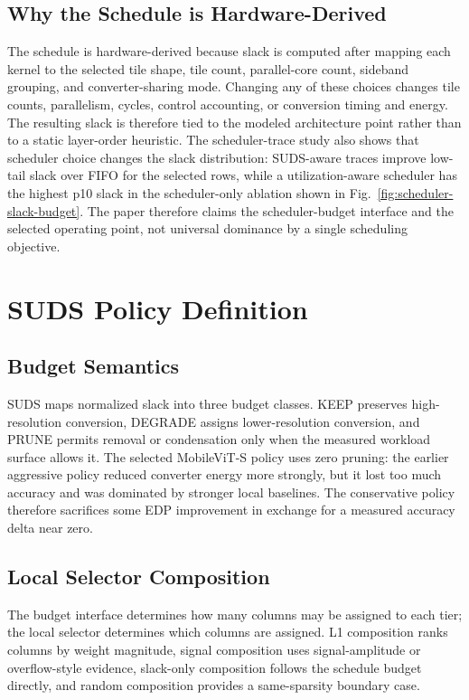 \documentclass[10pt,journal]{IEEEtran}
\begin{document}
\subsection{Why the Schedule is Hardware-Derived}

The schedule is hardware-derived because slack is computed after mapping each
kernel to the selected tile shape, tile count, parallel-core count, sideband
grouping, and converter-sharing mode. Changing any of these choices changes
tile counts, parallelism, cycles, control accounting, or conversion timing and
energy. The resulting slack is therefore tied to the modeled architecture point
rather than to a static layer-order heuristic. The scheduler-trace study also
shows that scheduler choice changes the slack distribution: SUDS-aware traces
improve low-tail slack over FIFO for the selected rows, while a
utilization-aware scheduler has the highest p10 slack in the scheduler-only
ablation shown in Fig.~\ref{fig:scheduler-slack-budget}. The paper therefore
claims the scheduler-budget interface and the selected operating point, not
universal dominance by a single scheduling objective.

\section{SUDS Policy Definition}

\subsection{Budget Semantics}

SUDS maps normalized slack into three budget classes. KEEP preserves
high-resolution conversion, DEGRADE assigns lower-resolution conversion, and
PRUNE permits removal or condensation only when the measured workload surface
allows it. The selected MobileViT-S policy uses zero pruning: the earlier
aggressive policy reduced converter energy more strongly, but it lost too much
accuracy and was dominated by stronger local baselines. The conservative policy
therefore sacrifices some EDP improvement in exchange for a measured accuracy
delta near zero.

\subsection{Local Selector Composition}

The budget interface determines how many columns may be assigned to each tier;
the local selector determines which columns are assigned. L1 composition ranks
columns by weight magnitude, signal composition uses signal-amplitude or
overflow-style evidence, slack-only composition follows the schedule budget
directly, and random composition provides a same-sparsity boundary case.
\end{document}
